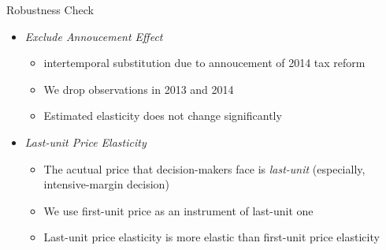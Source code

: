 \documentclass[
  ignorenonframetext,
  aspectratio=169,
]{beamer}
\providecommand{\tightlist}{%
  \setlength{\itemsep}{0pt}\setlength{\parskip}{0pt}}
\begin{document}
\begin{frame}{Robustness Check}
\protect\hypertarget{robustness-check}{}
\begin{itemize}
\tightlist
\item
  \emph{Exclude Annoucement Effect}

  \begin{itemize}
  \tightlist
  \item
    intertemporal substitution due to annoucement of 2014 tax reform
  \item
    We drop observations in 2013 and 2014
  \item
    Estimated elasticity does not change significantly
  \end{itemize}
\item
  \emph{Last-unit Price Elasticity}

  \begin{itemize}
  \tightlist
  \item
    The acutual price that decision-makers face is \emph{last-unit}
    (especially, intensive-margin decision)
  \item
    We use first-unit price as an instrument of last-unit one
  \item
    Last-unit price elasticity is more elastic
    than first-unit price elasticity
  \end{itemize}
\end{itemize}
\end{frame}
\end{document}
